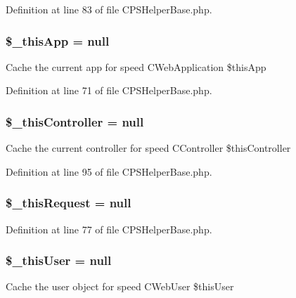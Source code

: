Definition at line 83 of file CPSHelperBase.php.

\hypertarget{classCPSHelperBase_af6f88e94a08d7714446e9d14aec8eccd}{
\subsubsection[{\$\_\-thisApp}]{\setlength{\rightskip}{0pt plus 5cm}\$\_\-thisApp = null}}
\label{classCPSHelperBase_af6f88e94a08d7714446e9d14aec8eccd}
Cache the current app for speed CWebApplication \$thisApp 

Definition at line 71 of file CPSHelperBase.php.

\hypertarget{classCPSHelperBase_a32cb14890abc35b436e106a457c6ca97}{
\subsubsection[{\$\_\-thisController}]{\setlength{\rightskip}{0pt plus 5cm}\$\_\-thisController = null}}
\label{classCPSHelperBase_a32cb14890abc35b436e106a457c6ca97}
Cache the current controller for speed CController \$thisController 

Definition at line 95 of file CPSHelperBase.php.

\hypertarget{classCPSHelperBase_ab300f41b1bfad0b7fbf250eb7fb46eea}{
\subsubsection[{\$\_\-thisRequest}]{\setlength{\rightskip}{0pt plus 5cm}\$\_\-thisRequest = null}}
\label{classCPSHelperBase_ab300f41b1bfad0b7fbf250eb7fb46eea}


Definition at line 77 of file CPSHelperBase.php.

\hypertarget{classCPSHelperBase_a942de4b5bc91566b1ca1452da4166059}{
\subsubsection[{\$\_\-thisUser}]{\setlength{\rightskip}{0pt plus 5cm}\$\_\-thisUser = null}}
\label{classCPSHelperBase_a942de4b5bc91566b1ca1452da4166059}
Cache the user object for speed CWebUser \$thisUser 

